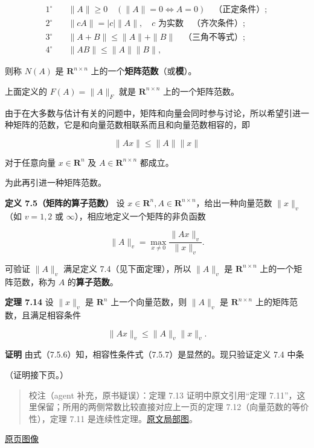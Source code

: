 \documentclass[
  10pt,
  fontset=fandol]{ctexart}
\begin{document}
\[
\begin{aligned}
1^\circ\quad &\|A\|\geqslant0\quad(\|A\|=0\Longleftrightarrow A=0)\quad\text{（正定条件）};\\
2^\circ\quad &\|cA\|=|c|\|A\|,\quad c\text{ 为实数}\quad\text{（齐次条件）};\\
3^\circ\quad &\|A+B\|\leqslant\|A\|+\|B\|\quad\text{（三角不等式）};\\
4^\circ\quad &\|AB\|\leqslant\|A\|\|B\|,
\end{aligned}
\tag{7.5.4}
\]

则称 \(N(A)\) 是 \(\mathbf R^{n\times n}\) 上的一个\textbf{矩阵范数}（或\textbf{模}）。

上面定义的 \(F(A)=\|A\|_F\) 就是 \(\mathbf R^{n\times n}\) 上的一个矩阵范数。

由于在大多数与估计有关的问题中，矩阵和向量会同时参与讨论，所以希望引进一种矩阵的范数，它是和向量范数相联系而且和向量范数相容的，即

\[
\|Ax\|\leqslant\|A\|\|x\|
\tag{7.5.5}
\]

对于任意向量 \(x\in\mathbf R^n\) 及 \(A\in\mathbf R^{n\times n}\) 都成立。

为此再引进一种矩阵范数。

\textbf{定义 7.5（矩阵的算子范数）} 设 \(x\in\mathbf R^n,A\in\mathbf R^{n\times n}\)，给出一种向量范数 \(\|x\|_v\)（如 \(v=1,2\) 或 \(\infty\)），相应地定义一个矩阵的非负函数

\[
\|A\|_v=\max_{x\neq0}\frac{\|Ax\|_v}{\|x\|_v}.
\tag{7.5.6}
\]

可验证 \(\|A\|_v\) 满足定义 7.4（见下面定理），所以 \(\|A\|_v\) 是 \(\mathbf R^{n\times n}\) 上的一个矩阵范数，称为 \(A\) 的\textbf{算子范数}。

\textbf{定理 7.14} 设 \(\|x\|_v\) 是 \(\mathbf R^n\) 上一个向量范数，则 \(\|A\|_v\) 是 \(\mathbf R^{n\times n}\) 上的矩阵范数，且满足相容条件

\[
\|Ax\|_v\leqslant\|A\|_v\|x\|_v.
\tag{7.5.7}
\]

\textbf{证明} 由式（7.5.6）知，相容性条件式（7.5.7）是显然的。现只验证定义 7.4 中条

（证明接下页。）

\begin{quote}
校注（agent 补充，原书疑误）：定理 7.13 证明中原文引用``定理 7.11''，这里保留；所用的两侧常数比较直接对应上一页的定理 7.12（向量范数的等价性），定理 7.11 是连续性定理。\href{../assets/ch07b/202-reference.png}{原文局部图}。
\end{quote}

\href{../../source-images/pdf-203.jpeg}{原页图像}
\end{document}
